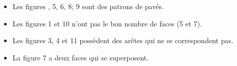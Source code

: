    \begin{itemize}
      \item Les figures {, 5, 6, 8; 9} sont des patrons de pavés.
      \item Les figures 1 et 10 n'ont pas le bon nombre de faces (5 et 7).
      \item Les figures 3, 4 et 11 possèdent des arêtes qui ne se correspondent pas.
      \item La figure 7 a deux faces qui se superposent.
   \end{itemize}
